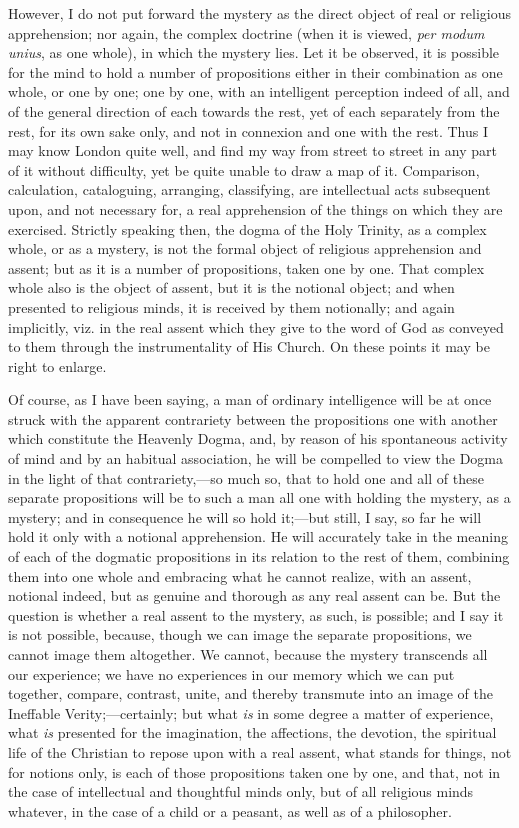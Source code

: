 However, I do not put forward the mystery as the direct object of
real or religious apprehension; nor again, the complex doctrine (when
it is viewed, \emph{per modum unius}, as one whole), in which the
mystery lies. Let it be observed, it is possible for the mind to hold
a number of propositions either in their combination as one whole, or
one by one; one by one, with an intelligent perception indeed of all,
and of the general direction of each towards the rest, yet of each
separately from the rest, for its own sake only, and not in connexion
and one with the rest. Thus I may know London quite well, and find my
way from street to street in any part of it without difficulty, yet be
quite unable to draw a map of it. Comparison, calculation,
cataloguing, arranging, classifying, are intellectual acts subsequent
upon, and not necessary for, a real apprehension of the things on
which they are exercised. Strictly speaking then, the dogma of the
Holy Trinity, as a complex whole, or as a mystery, is not the formal
object of religious apprehension and assent; but as it is a number of
propositions, taken one by one. That complex whole also is the object
of assent, but it is the notional object; and when presented to
religious minds, it is received by them notionally; and again
implicitly, viz. in the real assent which they give to the word of God
as conveyed to them through the instrumentality of His Church. On
these points it may be right to enlarge.

Of course, as I have been saying, a man of ordinary intelligence
will be at once struck with the apparent contrariety between the
propositions one with another which constitute the Heavenly Dogma,
and, by reason of his spontaneous activity of mind and by an habitual
association, he will be compelled to view the Dogma in the light of
that contrariety,—so much so, that to hold one and all of these
separate propositions will be to such a man all one with holding the
mystery, as a mystery; and in consequence he will so hold it;—but
still, I say, so far he will hold it only with a notional
apprehension. He will accurately take in the meaning of each of the
dogmatic propositions in its relation to the rest of them, combining
them into one whole and embracing what he cannot realize, with an
assent, notional indeed, but as genuine and thorough as any real
assent can be. But the question is whether a real assent to the
mystery, as such, is possible; and I say it is not possible, because,
though we can image the separate propositions, we cannot image them
altogether. We cannot, because the mystery transcends all our
experience; we have no experiences in our memory which we can put
together, compare, contrast, unite, and thereby transmute into an
image of the Ineffable Verity;—certainly; but what \emph{is} in some
degree a matter of experience, what \emph{is} presented for the
imagination, the affections, the devotion, the spiritual life of
the Christian to repose upon with a real assent, what stands for
things, not for notions only, is each of those propositions taken one
by one, and that, not in the case of intellectual and thoughtful minds
only, but of all religious minds whatever, in the case of a child or a
peasant, as well as of a philosopher.

